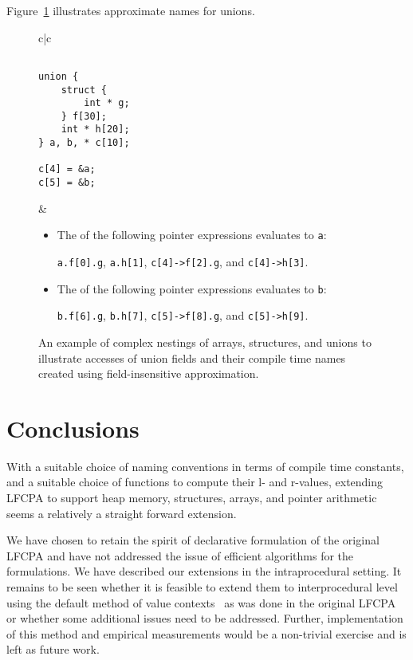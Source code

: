 \documentclass[a4paper,11pt,fleqn]{article}
\begin{document}
Figure~\ref{fig:exmp.union} illustrates approximate names for unions.

\begin{figure}[t]
\begin{center}
\begin{tabular}{c|c}
\begin{minipage}{40mm}
\begin{verbatim}

union {
    struct {
        int * g;
    } f[30];
    int * h[20];
} a, b, * c[10];

c[4] = &a;
c[5] = &b;

\end{verbatim}
\end{minipage}
&
\begin{minipage}{105mm}
\begin{itemize}
\item The \lval of the following pointer expressions evaluates to {\tt a}: 

	{\tt a.f[0].g}, {\tt a.h[1]}, {\tt c[4]->f[2].g}, and {\tt c[4]->h[3]}. 

\item The \lval of the following pointer expressions evaluates to {\tt b}: 

{\tt b.f[6].g}, {\tt b.h[7]}, {\tt c[5]->f[8].g}, and {\tt c[5]->h[9]}.
\end{itemize}
\end{minipage}
\end{tabular}
\end{center}
\caption{An example of complex nestings of arrays, structures, and unions to
illustrate accesses of union fields and their compile time names created using field-insensitive approximation.}
\label{fig:exmp.union}
\end{figure}



\section{Conclusions}
\label{sec:conclusions}

With a suitable choice of naming conventions in terms of compile time
constants, and a suitable choice of functions to compute their l- and
r-values, extending LFCPA to support heap memory, structures, arrays,
and pointer arithmetic seems a relatively a straight forward extension.

We have chosen to retain the spirit of declarative formulation of the
original LFCPA and have not addressed the issue of efficient algorithms
for the formulations. 
We have described our
extensions in the intraprocedural setting. It remains to be seen
whether it is feasible to extend them to interprocedural
level using the default method of value contexts~\cite{Khedker.UP.Karkare.B:2008:Efficiency-Precision-Simplicity,Khedker.UP.Sanyal.A.Karkare.B:2009:Data-Flow-Analysis,Padhye:2013:IDF:2487568.2487569}
as was done in the original LFCPA 
or whether some additional issues need to be addressed. Further,
implementation of this method and empirical measurements would be a
non-trivial exercise and is left as future work.
\end{document}
